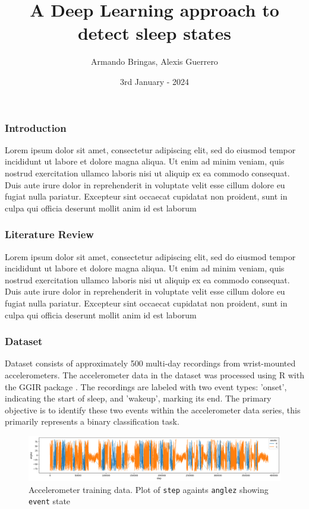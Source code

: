 \documentclass[10pt]{beamer}
\title{\Huge{A Deep Learning approach to detect sleep states}}
\author{Armando Bringas, Alexis Guerrero}
\date{3rd January - 2024}
\begin{document}
\begin{frame}
  \titlepage
\end{frame}

\begin{frame}
  \frametitle{Introduction}
  \begin{block}{}
    Lorem ipsum dolor sit amet, consectetur adipiscing elit, sed do eiusmod tempor incididunt ut labore et dolore magna aliqua. Ut enim ad minim veniam, quis nostrud exercitation ullamco laboris nisi ut aliquip ex ea commodo consequat. Duis aute irure dolor in reprehenderit in voluptate velit esse cillum dolore eu fugiat nulla pariatur. Excepteur sint occaecat cupidatat non proident, sunt in culpa qui officia deserunt mollit anim id est laborum
  \end{block} 
\end{frame}

\begin{frame}
  \frametitle{Literature Review}
  \begin{block}{}
    Lorem ipsum dolor sit amet, consectetur adipiscing elit, sed do eiusmod tempor incididunt ut labore et dolore magna aliqua. Ut enim ad minim veniam, quis nostrud exercitation ullamco laboris nisi ut aliquip ex ea commodo consequat. Duis aute irure dolor in reprehenderit in voluptate velit esse cillum dolore eu fugiat nulla pariatur. Excepteur sint occaecat cupidatat non proident, sunt in culpa qui officia deserunt mollit anim id est laborum
  \end{block} 
\end{frame}

\begin{frame}
  \frametitle{Dataset}
  \begin{block}{}
    Dataset consists of approximately 500 multi-day recordings from wrist-mounted accelerometers. The accelerometer data in the dataset was processed using R with the GGIR package \cite{Migueles2019GGIR}. The recordings are labeled with two event types: 'onset', indicating the start of sleep, and 'wakeup', marking its end. The primary objective is to identify these two events within the accelerometer data series, this primarily represents a binary classification task. 
    \begin{figure}
        \centering
        \includegraphics[width=1\linewidth]{038441c925bb_anglez.png}
        \caption{Accelerometer training data. Plot of \texttt{step} againts \texttt{anglez} showing \texttt{event} state}
        \label{fig:accelerometerdata_series-038441c925bb_anglez}
    \end{figure}
  \end{block} 
\end{frame}
\end{document}
